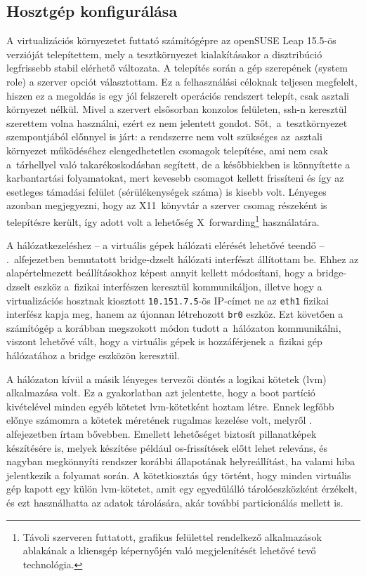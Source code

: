 \subsection{Hosztgép konfigurálása}
A virtualizációs környezetet futtató számítógépre az openSUSE Leap 15.5-ös verzióját telepítettem, mely a tesztkörnyezet kialakításakor a disztribúció legfrissebb stabil elérhető változata. A telepítés során a gép szerepének (system role) a szerver opciót választottam. Ez a felhasználási céloknak teljesen megfelelt, hiszen ez a megoldás is egy jól felszerelt operációs rendszert telepít, csak asztali környezet nélkül. Mivel a szervert elsősorban konzolos felületen, \acrshort{ssh}-n keresztül szerettem volna használni, ezért ez nem jelentett gondot. Sőt,~a~tesztkörnyezet szempontjából előnnyel is járt: a rendszerre nem volt szükséges az~asztali környezet működéséhez elengedhetetlen csomagok telepítése, ami nem csak a~tárhellyel való takarékoskodásban segített, de a későbbiekben is könnyítette a karbantartási folyamatokat, mert kevesebb csomagot kellett frissíteni és így az esetleges támadási felület (sérülékenységek száma) is kisebb volt. Lényeges azonban megjegyezni, hogy az X11~könyvtár a szerver csomag részeként is telepítésre került, így adott volt a lehetőség X~forwarding\footnote{Távoli szerveren futtatott, grafikus felülettel rendelkező alkalmazások ablakának a kliensgép képernyőjén való megjelenítését lehetővé tevő technológia.} használatára.

A hálózatkezeléshez -- a virtuális gépek hálózati elérését lehetővé teendő -- .~alfejezetben bemutatott bridge-dzselt hálózati interfészt állítottam be. Ehhez az alapértelmezett beállításokhoz képest annyit kellett módosítani, hogy a bridge-dzselt eszköz a~fizikai interfészen keresztül kommunikáljon, illetve hogy a virtualizációs hosztnak kiosztott \texttt{10.151.7.5}-ös IP-címet ne az \texttt{eth1} fizikai interfész kapja meg, hanem az újonnan létrehozott \texttt{br0} eszköz. Ezt követően a számítógép a korábban megszokott módon tudott a~hálózaton kommunikálni, viszont lehetővé vált, hogy a virtuális gépek is hozzáférjenek a~fizikai gép hálózatához a bridge eszközön keresztül.

A hálózaton kívül a másik lényeges tervezői döntés a logikai kötetek (\acrshort{lvm}) alkalmazása volt. Ez a gyakorlatban azt jelentette, hogy a boot partíció kivételével minden egyéb kötetet \acrshort{lvm}-kötetként hoztam létre. Ennek legfőbb előnye számomra a kötetek méretének rugalmas kezelése volt, melyről . alfejezetben írtam bővebben. Emellett lehetőséget biztosít pillanatképek készítésére is, melyek készítése például \acrshort{os}-frissítések előtt lehet releváns, és nagyban megkönnyíti rendszer korábbi állapotának helyreállítást, ha valami hiba jelentkezik a folyamat során. A kötetkiosztás úgy történt, hogy minden virtuális gép kapott egy külön \acrshort{lvm}-kötetet, amit egy egyedülálló tárolóeszközként érzékelt, és ezt használhatta az adatok tárolására, akár további particionálás mellett is.

